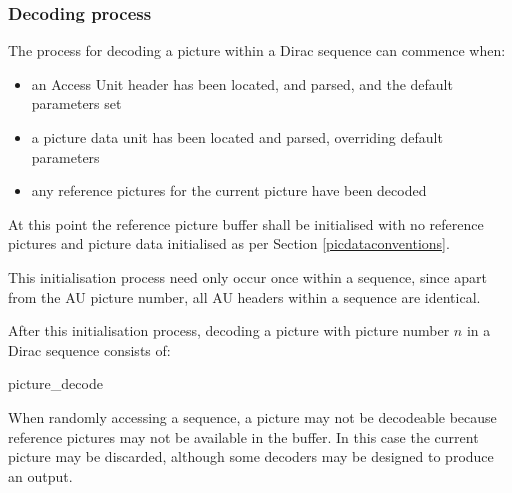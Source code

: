 \subsubsection{Decoding process}
\label{picturedecprocess}

The process for decoding a picture within a Dirac sequence can commence 
when: 
\begin{itemize}
\item an Access Unit header has been located, and parsed, and the default parameters set
\item a picture data unit has been located and parsed, overriding default parameters
\item any reference pictures for the current picture have been decoded
\end{itemize}

At this point the reference picture buffer shall be initialised with no 
reference pictures and picture data initialised as per Section \ref{picdataconventions}.

This initialisation process need only occur once within a sequence, since
apart from the AU picture number, all AU headers within a sequence are
identical. 

After this initialisation process, decoding a picture with picture number 
$n$ in a Dirac sequence consists of:

\begin{pseudo}{picture\_decode}{}
\bsIF{\ZeroResidual==\false}
\bsEND
{}
    \bsEND
\bsEND
{}
\bsRET{\CurrentPicture}
\end{pseudo}

When randomly accessing a sequence, a picture may not be decodeable because reference pictures
may not be available in the buffer. In this case the current picture may be discarded, although some
decoders may be designed to produce an output. 

